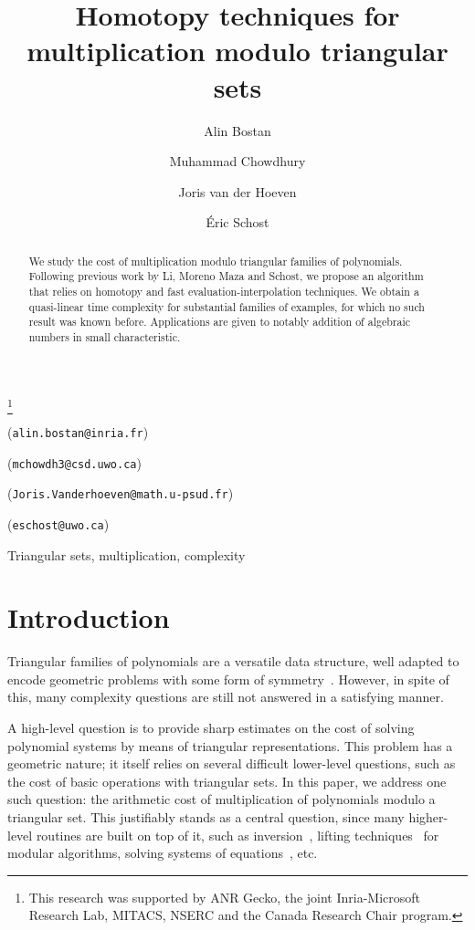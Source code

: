 \documentclass[amsthm]{elsart}
\theoremstyle{plain}
\newcommand{\ead}[1]{(\texttt{#1})}
\begin{document}
\begin{frontmatter}
\title{Homotopy techniques for multiplication modulo triangular sets}
\thanks{This research was supported by ANR Gecko, the joint
  Inria-Microsoft Research Lab, MITACS, NSERC and the Canada Research
  Chair program.}

\author{Alin Bostan} 
\ead{alin.bostan@inria.fr}
\address{Algorithms Project, INRIA Rocquencourt, 78153 Le Chesnay Cedex, France}
\author{Muhammad Chowdhury} 
\ead{mchowdh3@csd.uwo.ca}
\address{Computer Science Department, The University of Western Ontario, London, Ontario, Canada}
\author{Joris van der Hoeven} 
\ead{Joris.Vanderhoeven@math.u-psud.fr}
\address{CNRS, D\'epartement de Math\'ematiques, Universit\'e Paris-Sud, 91405 Orsay Cedex, France}
\author{{\'E}ric Schost} 
\ead{eschost@uwo.ca}
\address{Computer Science Department, The University of Western Ontario, London, Ontario, Canada}

\begin{abstract}
  We study the cost of multiplication modulo triangular families of
  polynomials. Following previous work by Li, Moreno Maza and Schost,
  we propose an algorithm that relies on homotopy and fast
  evaluation-interpolation techniques. We obtain a quasi-linear time
  complexity for substantial families of examples, for which no such
  result was known before. Applications are given to notably addition
  of algebraic numbers in small characteristic.
\end{abstract}

\begin{keyword}
Triangular sets, multiplication, complexity
\end{keyword}
\maketitle
\end{frontmatter}




\section{Introduction}\label{sec:intro}

Triangular families of polynomials are a versatile data structure,
well adapted to encode geometric problems with some form of
symmetry~\cite{AuVa00,KoMo02,FoMo02,GaSc04}. However, in spite of
this, many complexity questions are still not answered in a satisfying
manner.

A high-level question is to provide sharp estimates on the cost of
solving polynomial systems by means of triangular
representations. This problem has a geometric nature; it itself relies
on several difficult lower-level questions, such as the cost of basic
operations with triangular sets. In this paper, we address one such
question: the arithmetic cost of multiplication of polynomials modulo
a triangular set. This justifiably stands as a central question,
since many higher-level routines are built on top of it, such as
inversion~\cite{Langemyr91,HoMo02,LiMoSc07}, lifting
techniques~\cite{DaMaScWuXi05} for modular algorithms, solving systems
of equations~\cite{LiMoRaSc08b}, etc.
\end{document}
